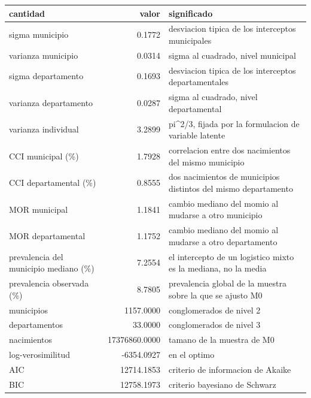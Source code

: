 \begin{tabular}{lrl}
\toprule
cantidad & valor & significado \\
\midrule
sigma municipio & 0.1772 & desviacion tipica de los interceptos municipales \\
varianza municipio & 0.0314 & sigma al cuadrado, nivel municipal \\
sigma departamento & 0.1693 & desviacion tipica de los interceptos departamentales \\
varianza departamento & 0.0287 & sigma al cuadrado, nivel departamental \\
varianza individual & 3.2899 & pi\textasciicircum{}2/3, fijada por la formulacion de variable latente \\
CCI municipal (\%) & 1.7928 & correlacion entre dos nacimientos del mismo municipio \\
CCI departamental (\%) & 0.8555 & dos nacimientos de municipios distintos del mismo departamento \\
MOR municipal & 1.1841 & cambio mediano del momio al mudarse a otro municipio \\
MOR departamental & 1.1752 & cambio mediano del momio al mudarse a otro departamento \\
prevalencia del municipio mediano (\%) & 7.2554 & el intercepto de un logistico mixto es la mediana, no la media \\
prevalencia observada (\%) & 8.7805 & prevalencia global de la muestra sobre la que se ajusto M0 \\
municipios & 1157.0000 & conglomerados de nivel 2 \\
departamentos & 33.0000 & conglomerados de nivel 3 \\
nacimientos & 17376860.0000 & tamano de la muestra de M0 \\
log-verosimilitud & -6354.0927 & en el optimo \\
AIC & 12714.1853 & criterio de informacion de Akaike \\
BIC & 12758.1973 & criterio bayesiano de Schwarz \\
\bottomrule
\end{tabular}
